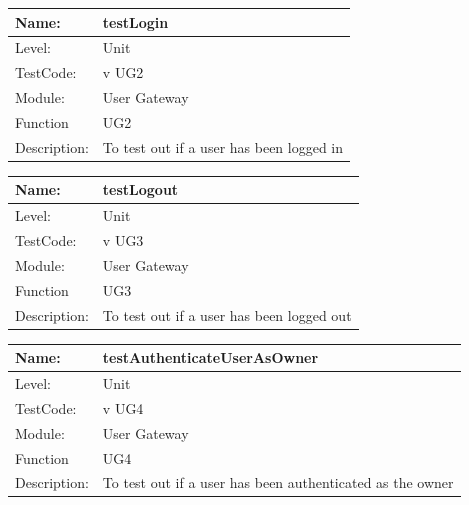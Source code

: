 \documentclass[12pt]{article}
\begin{document}
\begin{flushleft}
\begin{center}
\begin{tabular}{|l|p{12cm}|}
\end{tabular}
\end{center}

\begin{center}
\begin{tabular}{|l|p{12cm}|}
\hline

 Name: & testLogin\\
\hline
Level: & Unit \\
\hline
TestCode: & v UG2 \\
\hline
Module:& User Gateway\\
\hline
Function & UG2 \\
\hline
Description: & To test out if a user has been logged in \\
\hline

\end{tabular}
\end{center}


\begin{center}
\begin{tabular}{|l|p{12cm}|}
\hline

 Name: & testLogout\\
\hline
Level: & Unit \\
\hline
TestCode: & v UG3 \\
\hline
Module:& User Gateway\\
\hline
Function & UG3 \\
\hline
Description: & To test out if a user has been logged out \\
\hline

\end{tabular}
\end{center}


\begin{center}
\begin{tabular}{|l|p{12cm}|}
\hline

 Name: & testAuthenticateUserAsOwner \\
\hline
Level: & Unit \\
\hline
TestCode: & v UG4 \\
\hline
Module:& User Gateway\\
\hline
Function & UG4 \\
\hline
Description: & To test out if a user has been authenticated as the owner \\
\hline


\end{tabular}
\end{center}
\end{flushleft}
\end{document}
